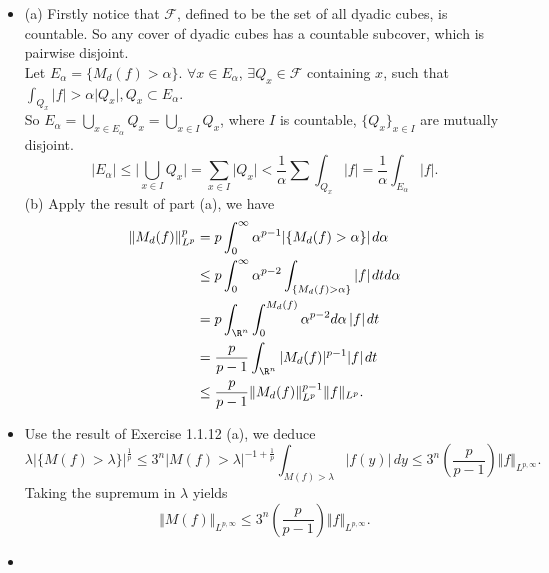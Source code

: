 \begin{itemize}
\item[2.1.12]

(a) Firstly notice that $\mathscr{F}$, defined to be the set of all dyadic cubes, is countable. 
So any cover of dyadic cubes has a countable subcover, which is pairwise disjoint.\\
Let $E_\alpha=\{M_d(f)>\alpha\}$. 
$\forall x\in E_\alpha$, $\exists Q_x\in \mathscr{F}$ containing $x$, 
such that $\int_{Q_x}\vert f\vert>\alpha\vert Q_x\vert, Q_x\subset E_\alpha$.\\
So $E_\alpha=\bigcup\limits_{x\in E_\alpha}Q_x=\bigcup\limits_{x\in I}Q_x$, where $I$ is countable, 
$\{Q_x\}_{x\in I}$ are mutually disjoint.\\
$$\vert E_\alpha\vert\leq\vert\bigcup\limits_{x\in I}Q_x\vert
=\sum\limits_{x\in I}\vert Q_x\vert<\frac{1}{\alpha}\sum\int_{Q_x}\vert f\vert
=\frac1\alpha\int_{E_\alpha}\vert f\vert.$$
(b) Apply the result of part (a), we have
\begin{align*}
\Vert M_d(f)\Vert_{L^p}^p
&=p\int_0^\infty\alpha^{p-1}\vert \{M_d(f)>\alpha\}\vert\>d\alpha\\
&\leq p\int_0^\infty\alpha^{p-2}\int_{\{M_d(f)>\alpha\}}\vert f\vert\>dtd\alpha\\
&=p\int_{\R^n}\int_0^{M_d(f)}\alpha^{p-2}d\alpha \,\vert f\vert\>dt\\
&=\frac{p}{p-1}\int_{\R^n} \vert M_d(f)\vert^{p-1}\vert f\vert\>dt\\
&\leq\frac{p}{p-1}\Vert M_d(f)\Vert_{L^p}^{p-1}\Vert f\Vert_{L^p}.
\end{align*}

\item[2.1.13]
Use the result of Exercise 1.1.12 (a), we deduce
$$\lambda\vert\{M(f)>\lambda\}\vert^{\frac1p}
\leq3^n|M(f)>\lambda|^{-1+\frac{1}{p}}\int_{M(f)>\lambda}|f(y)|\,dy
\leq3^n\left(\frac{p}{p-1}\right)\Vert f\Vert_{L^{p,\infty}}.$$
Taking the supremum in $\lambda$ yields
$$\Vert M(f)\Vert_{L^{p,\infty}}\leq 3^n\left(\frac{p}{p-1}\right)\Vert f\Vert_{L^{p,\infty}}.$$

\item[2.1.14]


\end{itemize}
